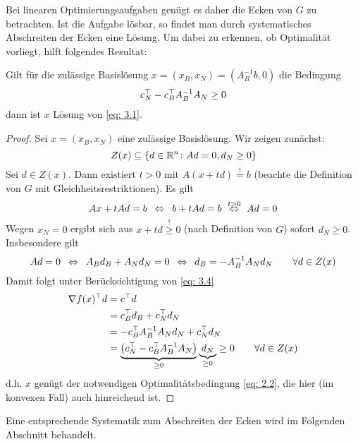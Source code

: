 Bei linearen Optimierungsaufgaben genügt es daher die Ecken von $G$ zu betrachten. Ist die Aufgabe lösbar, so findet man durch systematisches Abschreiten der Ecken eine Lösung.
Um dabei zu erkennen, ob Optimalität vorliegt, hilft folgendes Resultat:

\begin{aussage}[Optimalitätskriterium] %
	\label{aussage: 3.4}
	Gilt für die zulässige Basislösung $x = (x_B, x_N) = (A_B^{-1}b, 0)$ die Bedingung 
	\begin{equation}
		c_N^{\top} - c_B^{\top} A_B^{-1} A_N \ge 0 \label{eq: 3.4}
	\end{equation}
	dann ist $x$ Lösung von \eqref{eq: 3.1}.
\end{aussage}
\begin{proof}
	Sei $x = (x_B, x_N)$ eine zulässige Basislösung. Wir zeigen zunächst:
	\begin{equation*}
		Z(x) \subseteq \left\{ d \in \mathbb{R}^n \colon Ad = 0, d_N \ge 0 \right\}
	\end{equation*}
	Sei $d \in Z(x)$. Dann existiert $t > 0$ mit $A(x+td) \overset{!}{=} b$ (beachte die Definition von $G$ mit Gleichheitsrestriktionen). Es gilt 
	\begin{equation*}
		Ax + t Ad = b  \enskip \Leftrightarrow \enskip b + t Ad = b \overset{t > 0}{\enskip \Leftrightarrow \enskip} Ad = 0
	\end{equation*}
	Wegen $x_N = 0$ ergibt sich aus $x + td \overset{!}{\ge} 0$ (nach Definition von $G$) sofort $d_N \ge 0$. Insbesondere gilt
	\begin{equation*}
		Ad = 0 \enskip \Leftrightarrow \enskip A_B d_B + A_N d_N = 0 \enskip \Leftrightarrow \enskip d_B = -A_B^{-1} A_N d_N \qquad \forall d \in Z(x)
	\end{equation*}
	Damit folgt unter Berücksichtigung von \eqref{eq: 3.4}
	\begin{align*}
		\nabla f(x)^{\top} d 
		&= c^{\top} d \\
		&= c_B^{\top} d_B + c_N^{\top} d_N \\
		&= -c_B^{\top} A_B^{-1} A_N d_N + c_N^{\top} d_N \\
		&= \underbrace{\left( c_N^{\top} - c_B^{\top} A_B^{-1} A_N \right)}_{\ge 0} \underbrace{d_N}_{\ge 0} \ge 0 \qquad \forall d \in Z(x)
	\end{align*}
	d.h. $x$ genügt der notwendigen Optimalitätsbedingung \eqref{eq: 2.2}, die hier (im konvexen Fall) auch hinreichend ist.
\end{proof}

Eine entsprechende Systematik zum Abschreiten der Ecken wird im Folgenden Abschnitt behandelt.